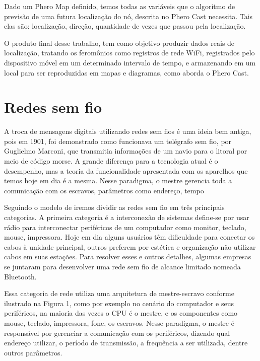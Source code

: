\documentclass[12pt, %
openright, 
oneside,
a4paper,
brazil]{facom-ufu-abntex2}
\begin{document}
	Dado um Phero Map definido, temos todas as variáveis que o algoritmo de previsão de uma futura localização do nó, descrita no Phero Cast necessita. Tais elas são: localização, direção, quantidade de vezes que passou pela localização. 
	
 	O produto final desse trabalho, tem como objetivo produzir dados reais de localização, tratando os feromônios como registros de rede \ac{WiFi}, registrados pelo dispositivo móvel em um determinado intervalo de tempo, e armazenando em um local para ser reproduzidas em mapas e diagramas, como aborda o Phero Cast.

\section{Redes sem fio}
A troca de mensagens digitais utilizando redes sem fios é uma ideia bem antiga, pois em 1901, foi demonstrado como funcionava um telégrafo sem fio, por Guglielmo Marconi, que transmitia informações de um navio para o litoral por meio de código morse. A grande diferença para a tecnologia atual é o desempenho, mas a teoria da funcionalidade apresentada com os aparelhos que temos hoje em dia é a mesma. Nesse paradigma, o mestre gerencia toda a comunicação com os escravos, parâmetros como endereço, tempo 

Seguindo o modelo de \cite{tanenbaum2003redes} iremos dividir as redes sem fio em três principais categorias. A primeira categoria é a interconexão de sistemas define-se por usar rádio para interconectar periféricos de um computador como monitor, teclado, mouse, impressora. Hoje em dia alguns usuários têm dificuldade para conectar os cabos à unidade principal, outros preferem por estética e organização não utilizar cabos em suas estações. Para resolver esses e outros detalhes, algumas empresas se juntaram para desenvolver uma rede sem fio de alcance limitado nomeada Bluetooth.

Essa categoria de rede utiliza uma arquitetura de mestre-escravo conforme ilustrado na Figura 1, como por exemplo no cenário do computador e seus periféricos, na maioria das vezes o CPU é o mestre, e os componentes como mouse, teclado, impressora, fone, os escravos. Nesse paradigma, o mestre é responsável por gerenciar a comunicação com os periféricos, dizendo qual endereço utilizar, o período de transmissão, a frequência a ser utilizada, dentre outros parâmetros.
\end{document}
